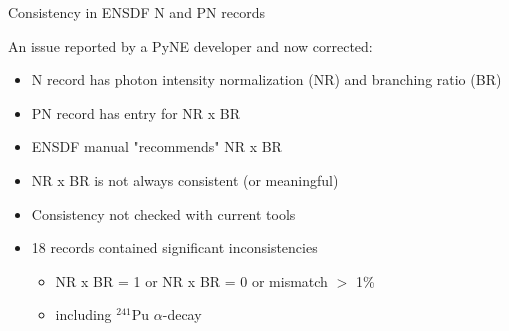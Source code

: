 \documentclass[xcolor=x11names,compress]{beamer}
\renewcommand{\(}{\begin{columns}}
\renewcommand{\)}{\end{columns}}
\newcommand{\<}[1]{\begin{column}{#1}}
\renewcommand{\>}{\end{column}}
\begin{document}
\begin{frame}{Consistency in ENSDF N and PN records}

    An issue reported by a PyNE developer and \alert{now corrected}:
    \vspace*{1 em}
    \begin{itemize}
        \item N record has photon intensity normalization (NR) and branching ratio (BR)
        \item PN record has entry for NR x BR
        \item ENSDF manual "recommends" NR x BR
        \item NR x BR is not always consistent (or meaningful)
        \item Consistency not checked with current tools
        \item 18 records contained significant inconsistencies
        \begin{itemize}
            \item NR x BR = 1 or NR x BR = 0 or mismatch $>$ 1\%
            \item including $^{241}$Pu $\alpha$-decay
        \end{itemize}
    \end{itemize}

\end{frame}
\end{document}
